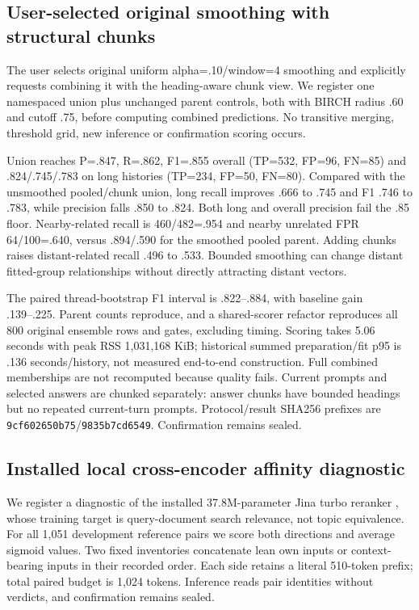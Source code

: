 \documentclass[11pt]{article}
\begin{document}
\subsection{User-selected original smoothing with structural chunks}
The user selects original uniform alpha=.10/window=4 smoothing and explicitly
requests combining it with the heading-aware chunk view. We register one
namespaced union plus unchanged parent controls, both with BIRCH radius .60
and cutoff .75, before computing combined predictions. No transitive merging,
threshold grid, new inference or confirmation scoring occurs.

Union reaches P=.847, R=.862, F1=.855 overall (TP=532, FP=96, FN=85) and
.824/.745/.783 on long histories (TP=234, FP=50, FN=80). Compared with the
unsmoothed pooled/chunk union, long recall improves .666 to .745 and F1 .746
to .783, while precision falls .850 to .824. Both long and overall precision
fail the .85 floor. Nearby-related recall is 460/482=.954 and nearby unrelated
FPR 64/100=.640, versus .894/.590 for the smoothed pooled parent. Adding chunks
raises distant-related recall .496 to .533. Bounded smoothing can change
distant fitted-group relationships without directly attracting distant vectors.

The paired thread-bootstrap F1 interval is .822--.884, with baseline gain
.139--.225. Parent counts reproduce, and a shared-scorer refactor reproduces
all 800 original ensemble rows and gates, excluding timing. Scoring takes
5.06 seconds with peak RSS 1,031,168 KiB; historical summed preparation/fit p95
is .136 seconds/history, not measured end-to-end construction. Full combined
memberships are not recomputed because quality fails. Current prompts and
selected answers are chunked separately: answer chunks have bounded headings
but no repeated current-turn prompts. Protocol/result SHA256 prefixes are
\texttt{9cf602650b75}/\texttt{9835b7cd6549}. Confirmation remains sealed.

\subsection{Installed local cross-encoder affinity diagnostic}
We register a diagnostic of the installed 37.8M-parameter Jina turbo reranker
\cite{jinareranker}, whose training target is query-document search relevance,
not topic equivalence. For all 1,051 development reference pairs we score both
directions and average sigmoid values. Two fixed inventories concatenate lean
own inputs or context-bearing inputs in their recorded order. Each side retains
a literal 510-token prefix; total paired budget is 1,024 tokens. Inference reads
pair identities without verdicts, and confirmation remains sealed.
\end{document}
